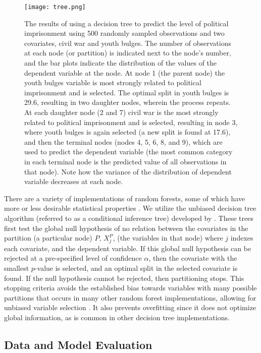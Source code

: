 \documentclass[11pt]{article}
\begin{document}
\begin{figure}[!htpb]
\centering
\texttt{[image: tree.png]}
\caption{The results of using a decision tree to predict the level of political imprisonment using 500 randomly sampled observations and two covariates, civil war and youth bulges. The number of observations at each node (or partition) is indicated next to the node's number, and the bar plots indicate the distribution of the values of the dependent variable at the node. At node 1 (the parent node) the youth bulges variable is most strongly related to political imprisonment and is selected. The optimal split in youth bulges is 29.6, resulting in two daughter nodes, wherein the process repeats. At each daughter node (2 and 7) civil war is the most strongly related to political imprisonment and is selected, resulting in node 3, where youth bulges is again selected (a new split is found at 17.6), and then the terminal nodes (nodes 4, 5, 6, 8, and 9), which are used to predict the dependent variable (the most common category in each terminal node is the predicted value of all observations in that node). Note how the variance of the distribution of dependent variable decreases at each node.}
\label{fig:tree}
\end{figure}

There are a variety of implementations of random forests, some of which have more or less desirable statistical properties \citep{strobl2009introduction, siroky2009navigating}. We utilize the unbiased decision tree algorithm (referred to as a conditional inference tree) developed by \citet{hothorn2006unbiased}. These trees first test the global null hypothesis of no relation between the covariates in the partition (a particular node) $P$, $X_j^P$, (the variables in that node) where $j$ indexes each covariate, and the dependent variable. If this global null hypothesis can be rejected at a pre-specified level of confidence $\alpha$, then the covariate with the smallest $p$-value is selected, and an optimal split in the selected covariate is found. If the null hypothesis cannot be rejected, then partitioning stops. This stopping criteria avoids the established bias towards variables with many possible partitions that occurs in many other random forest implementations, allowing for unbiased variable selection \citep{hothorn2006unbiased, strobl2007bias}. It also prevents overfitting since it does not optimize global information, as is common in other decision tree implementations.

\subsection{Data and Model Evaluation}
\end{document}
